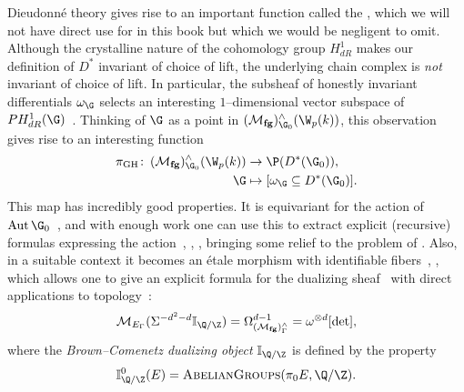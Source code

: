 \begin{remark}\label{ThePeriodMapSection}
Dieudonn\'e theory gives rise to an important function called the , which we will not have direct use for in this book but which we would be negligent to omit.  Although the crystalline nature of the cohomology group \(H^1_{dR}\) makes our definition of \(D^*\) invariant of choice of lift, the underlying chain complex is \emph{not} invariant of choice of lift.  In particular, the subsheaf of honestly invariant differentials \(\omega_{\G}\) selects an interesting \(1\)--dimensional vector subspace of \(PH^1_{dR}(\G)\)~\cite[Section 2.3]{MoravaCobordismComodules}.  Thinking of \(\G\) as a point in \((\moduli{fg})^\wedge_{\G_0}(\W_p(k))\), this observation gives rise to an interesting function
\begin{align*}
\pi_{\mathrm{GH}}\co (\moduli{fg})^\wedge_{\G_0}(\W_p(k)) & \to \P(D^*(\G_0)), \\
\G & \mapsto [\omega_{\G} \subseteq D^*(\G_0)].
\end{align*}
This map has incredibly good properties.  It is equivariant for the action of \(\Aut \G_0\)~\cite[Theorem 1]{HopkinsGrossAnnouncement}, and with enough work one can use this to extract explicit (recursive) formulas expressing the action~\cite{DevinatzHopkins}, \cite[Section 24]{StricklandFPFP}, \cite[Section 22]{HopkinsGrossEquivVBs}, bringing some relief to the problem of .  Also, in a suitable context it becomes an \'etale morphism with identifiable fibers~\cite[Theorem 1]{HopkinsGrossAnnouncement}, \cite[Sections 23-4]{HopkinsGrossEquivVBs}, which allows one to give an explicit formula for the dualizing sheaf~\cite[Corollary 3]{HopkinsGrossAnnouncement} with direct applications to topology~\cite[Theorem 6]{HopkinsGrossAnnouncement}: \[\context{E_\Gamma}(\Susp^{-d^2 - d} \mathbb I_{\Q/\Z}) = \Omega^{d - 1}_{(\moduli{fg})^\wedge_\Gamma} = \omega^{\otimes d}[\det],\] where the \textit{Brown--Comenetz dualizing object} \(\mathbb I_{\Q/\Z}\) is defined by the property \[\mathbb I_{\Q/\Z}^0(E) = \CatOf{AbelianGroups}(\pi_0 E, \Q/\Z).\]


\end{remark}

